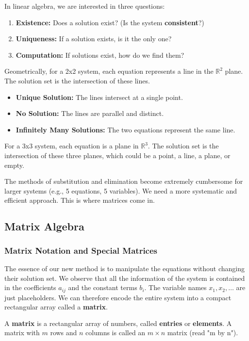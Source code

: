 \documentclass[oneside]{book}
\begin{document}
In linear algebra, we are interested in three questions:
\begin{enumerate}
    \item \textbf{Existence:} Does a solution exist? (Is the system \textbf{consistent}?)
    \item \textbf{Uniqueness:} If a solution exists, is it the only one?
    \item \textbf{Computation:} If solutions exist, how do we find them?
\end{enumerate}

Geometrically, for a 2x2 system, each equation represents a line in the $\mathbb{R}^2$ plane. The solution set is the intersection of these lines.
\begin{itemize}
    \item \textbf{Unique Solution:} The lines intersect at a single point.
    \item \textbf{No Solution:} The lines are parallel and distinct.
    \item \textbf{Infinitely Many Solutions:} The two equations represent the same line.
\end{itemize}
% 

For a 3x3 system, each equation is a plane in $\mathbb{R}^3$. The solution set is the intersection of these three planes, which could be a point, a line, a plane, or empty.
% 

The methods of substitution and elimination become extremely cumbersome for larger systems (e.g., 5 equations, 5 variables). We need a more systematic and efficient approach. This is where matrices come in.

\subsection{Matrix Algebra}

\subsubsection{Matrix Notation and Special Matrices}

The essence of our new method is to manipulate the equations without changing their solution set. We observe that all the information of the system is contained in the coefficients $a_{ij}$ and the constant terms $b_i$. The variable names $x_1, x_2, \ldots$ are just placeholders. We can therefore encode the entire system into a compact rectangular array called a \textbf{matrix}.

\begin{definition}
A \textbf{matrix} is a rectangular array of numbers, called \textbf{entries} or \textbf{elements}. A matrix with $m$ rows and $n$ columns is called an $m \times n$ matrix (read "m by n").
\end{definition}
\end{document}

